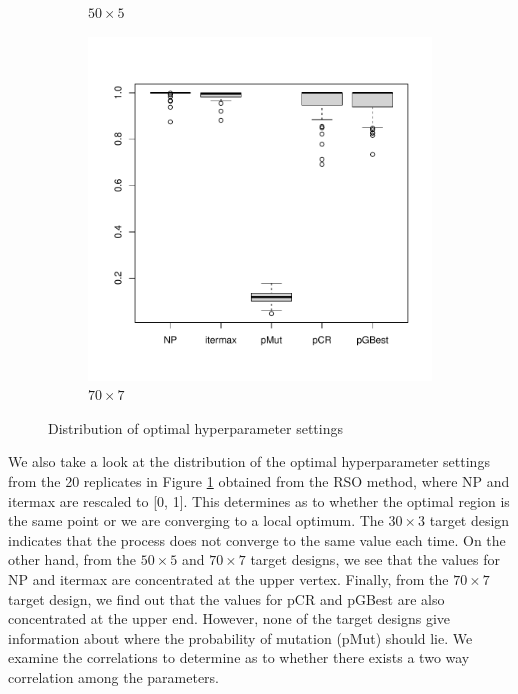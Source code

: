 \documentclass [PhD] {package/uclathes}
\begin{document}
\begin{figure}
\begin{subfigure}[b]{0.3\textwidth}
\caption{$50\times 5$}
\end{subfigure}
\begin{subfigure}[b]{0.3\textwidth}
\centering
\includegraphics{chapters/RSO/pdfs/corplot70}
\caption{$70\times 7$}
\end{subfigure}
\caption{Distribution of optimal hyperparameter settings}
\label{fig:optimalpoints}
\end{figure}

We also take a look at the distribution of the optimal hyperparameter settings from the 20 replicates in Figure \ref{fig:optimalpoints} obtained from the RSO method, where NP and itermax are rescaled to [0, 1]. This determines as to whether the optimal region is the same point or we are converging to a local optimum.
The $30 \times 3$ target design indicates that the process does not converge to the same value each time. On the other hand, from the $50 \times 5$ and $70 \times 7$ target designs, we see that the  values for NP and itermax  are concentrated at the upper vertex. Finally, from the $70 \times 7$ target design, we find out that the values for pCR and pGBest  are also  concentrated at the upper end. However, none of the target designs give information about where the probability of mutation (pMut) should lie.
We examine the correlations to determine as to whether there exists a two way correlation among the parameters.
\end{document}
